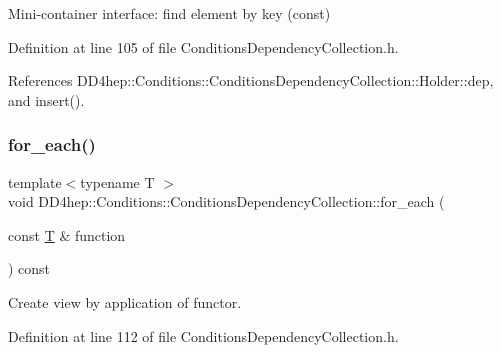 Mini-\/container interface\+: find element by key (const) 



Definition at line 105 of file Conditions\+Dependency\+Collection.\+h.



References D\+D4hep\+::\+Conditions\+::\+Conditions\+Dependency\+Collection\+::\+Holder\+::dep, and insert().

\hypertarget{class_d_d4hep_1_1_conditions_1_1_conditions_dependency_collection_a796b0e2bce797326b441c3a0d05787f6}{}\label{class_d_d4hep_1_1_conditions_1_1_conditions_dependency_collection_a796b0e2bce797326b441c3a0d05787f6} 
\subsubsection{\texorpdfstring{for\+\_\+each()}{for\_each()}}
{\footnotesize\ttfamily template$<$typename T $>$ \\
void D\+D4hep\+::\+Conditions\+::\+Conditions\+Dependency\+Collection\+::for\+\_\+each (\begin{DoxyParamCaption}\item[{const \hyperlink{class_t}{T} \&}]{function }\end{DoxyParamCaption}) const\hspace{0.3cm}{\ttfamily [inline]}}



Create view by application of functor. 



Definition at line 112 of file Conditions\+Dependency\+Collection.\+h.

\hypertarget{class_d_d4hep_1_1_conditions_1_1_conditions_dependency_collection_a2135e9b1eb88d36301f88d9ef33a11a8}{}\label{class_d_d4hep_1_1_conditions_1_1_conditions_dependency_collection_a2135e9b1eb88d36301f88d9ef33a11a8} 
